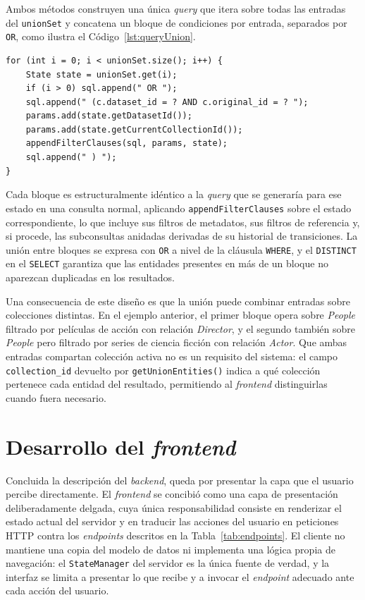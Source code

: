 Ambos métodos construyen una única \textit{query} que itera sobre todas las entradas del
\texttt{unionSet} y concatena un bloque de condiciones por entrada, separados por
\texttt{OR}, como ilustra el Código~\ref{lst:queryUnion}.

\begin{lstlisting}[style=javaStyle, caption=\textit{Query} de unión, label=lst:queryUnion]
for (int i = 0; i < unionSet.size(); i++) {
    State state = unionSet.get(i);
    if (i > 0) sql.append(" OR ");
    sql.append(" (c.dataset_id = ? AND c.original_id = ? ");
    params.add(state.getDatasetId());
    params.add(state.getCurrentCollectionId());
    appendFilterClauses(sql, params, state);
    sql.append(" ) ");
}
\end{lstlisting}

Cada bloque es estructuralmente idéntico a la \textit{query} que se generaría para ese estado en
una consulta normal, aplicando \texttt{appendFilterClauses} sobre el estado correspondiente,
lo que incluye sus filtros de metadatos, sus filtros de referencia y, si procede, las
subconsultas anidadas derivadas de su historial de transiciones. La unión entre bloques
se expresa con \texttt{OR} a nivel de la cláusula \texttt{WHERE}, y el \texttt{DISTINCT}
en el \texttt{SELECT} garantiza que las entidades presentes en más de un bloque no
aparezcan duplicadas en los resultados.

Una consecuencia de este diseño es que la unión puede combinar entradas sobre
colecciones distintas. En el ejemplo anterior, el primer bloque opera sobre
\textit{People} filtrado por películas de acción con relación \textit{Director}, y el
segundo también sobre \textit{People} pero filtrado por series de ciencia ficción con
relación \textit{Actor}. Que ambas entradas compartan colección activa no es un requisito
del sistema: el campo \texttt{collection\_id} devuelto por \texttt{getUnionEntities()}
indica a qué colección pertenece cada entidad del resultado, permitiendo al \textit{frontend}
distinguirlas cuando fuera necesario.

\section{Desarrollo del \textit{frontend}}
\label{sec:frontend}

Concluida la descripción del \textit{backend}, queda por presentar la capa
que el usuario percibe directamente. El \textit{frontend} se concibió como una
capa de presentación deliberadamente delgada, cuya única
responsabilidad consiste en renderizar el estado actual del servidor
y en traducir las acciones del usuario en peticiones HTTP contra los
\textit{endpoints} descritos en la Tabla~\ref{tab:endpoints}. El
cliente no mantiene una copia del modelo de datos ni implementa una
lógica propia de navegación: el \texttt{StateManager} del servidor es
la única fuente de verdad, y la interfaz se limita a presentar lo que
recibe y a invocar el \textit{endpoint} adecuado ante cada acción del
usuario.

